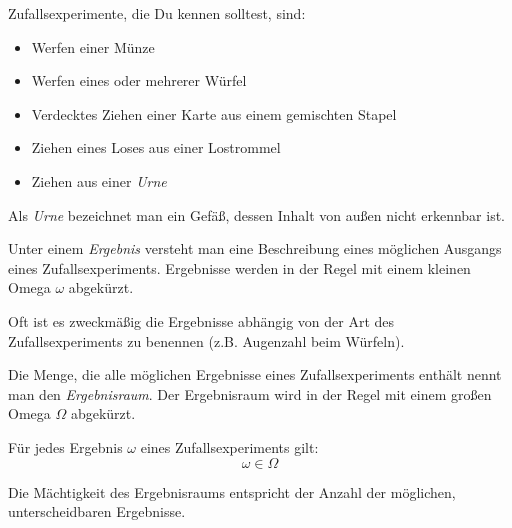 \begin{bsp}[Zufallsexperimente]
 Zufallsexperimente, die Du kennen solltest, sind:
 \begin{itemize}
  \item Werfen einer Münze
  \item Werfen eines oder mehrerer Würfel
  \item Verdecktes Ziehen einer Karte aus einem gemischten Stapel
  \item Ziehen eines Loses aus einer Lostrommel
  \item Ziehen aus einer \emph{Urne}
 \end{itemize}
 Als \emph{Urne} bezeichnet man ein Gefäß, dessen Inhalt von außen nicht erkennbar ist.
\end{bsp}

\begin{defi}[Ergebnis]
 Unter einem \emph{Ergebnis} versteht man eine Beschreibung eines möglichen Ausgangs eines Zufallsexperiments. Ergebnisse werden in der Regel mit einem kleinen Omega \(\omega\) abgekürzt.

Oft ist es zweckmäßig die Ergebnisse abhängig von der Art des Zufallsexperiments zu benennen (z.B. Augenzahl beim Würfeln).
\end{defi}

\begin{defi}[Ergebnisraum]
 Die Menge, die alle möglichen Ergebnisse eines Zufallsexperiments enthält nennt man den \emph{Ergebnisraum}. Der Ergebnisraum wird in der Regel mit einem großen Omega \(\Omega\) abgekürzt.
 
 Für jedes Ergebnis \(\omega\) eines Zufallsexperiments gilt: \begin{equation*}                                              \omega \in \Omega                                      \end{equation*}
 
 Die Mächtigkeit des Ergebnisraums entspricht der Anzahl der möglichen, unterscheidbaren Ergebnisse.
\end{defi}

